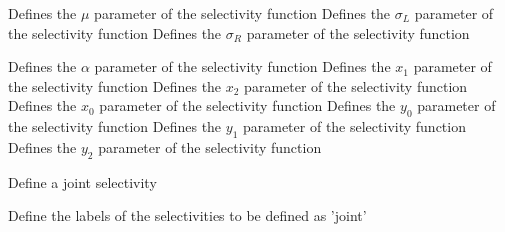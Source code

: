  {Defines the $\mu$ parameter of the selectivity function}
 {Defines the $\sigma_L$ parameter of the selectivity function}
 {Defines the $\sigma_R$ parameter of the selectivity function}
\par\textbf{}\par
{} {Defines the $\alpha$ parameter of the selectivity function}
 {Defines the $x_1$ parameter of the selectivity function}
 {Defines the $x_2$ parameter of the selectivity function}
 {Defines the $x_0$ parameter of the selectivity function}
 {Defines the $y_0$ parameter of the selectivity function}
 {Defines the $y_1$ parameter of the selectivity function}
 {Defines the $y_2$ parameter of the selectivity function}
\par{} {Define a joint selectivity}\par
{} {Define the labels of the selectivities to be defined as 'joint'}

